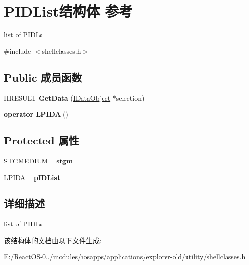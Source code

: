 \hypertarget{struct_p_i_d_list}{}\section{P\+I\+D\+List结构体 参考}
\label{struct_p_i_d_list}


list of P\+I\+D\+Ls  




{\ttfamily \#include $<$shellclasses.\+h$>$}

\subsection*{Public 成员函数}
\begin{DoxyCompactItemize}
\item 
\mbox{\label{struct_p_i_d_list_ac6bf12732c8afc9eb39de37a587942b7}} 
H\+R\+E\+S\+U\+LT {\bfseries Get\+Data} (\hyperlink{interface_i_data_object}{I\+Data\+Object} $\ast$selection)
\item 
\mbox{\label{struct_p_i_d_list_aebd3efff282e85f7398cfcd44a8a0e9c}} 
{\bfseries operator L\+P\+I\+DA} ()
\end{DoxyCompactItemize}
\subsection*{Protected 属性}
\begin{DoxyCompactItemize}
\item 
\mbox{\label{struct_p_i_d_list_adca6dabbd9a21301234a71998c26b2c0}} 
S\+T\+G\+M\+E\+D\+I\+UM {\bfseries \+\_\+stgm}
\item 
\mbox{\label{struct_p_i_d_list_a7bcb326d84bbf47dd583fec5c2d7be5b}} 
\hyperlink{struct_c_i_d_a}{L\+P\+I\+DA} {\bfseries \+\_\+p\+I\+D\+List}
\end{DoxyCompactItemize}


\subsection{详细描述}
list of P\+I\+D\+Ls 

该结构体的文档由以下文件生成\+:\begin{DoxyCompactItemize}
\item 
E\+:/\+React\+O\+S-\/0../modules/rosapps/applications/explorer-\/old/utility/shellclasses.\+h\end{DoxyCompactItemize}
